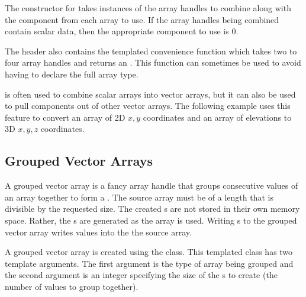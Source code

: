 The constructor for  takes
instances of the array handles to combine along with the component from
each array to use. If the array handles being combined contain scalar data,
then the appropriate component to use is 0.


The  header also
contains the templated convenience function
 which takes two to four array
handles and returns an . This
function can sometimes be used to avoid having to declare the full array
type.


 is often used to combine scalar
arrays into vector arrays, but it can also be used to pull components out
of other vector arrays. The following example uses this feature to convert
an array of 2D $x,y$ coordinates and an array of elevations to 3D $x,y,z$
coordinates.



\subsection{Grouped Vector Arrays}
\label{sec:GroupedVectorArrays}


A grouped vector array is a fancy array handle that groups consecutive
values of an array together to form a . The source array must be
of a length that is divisible by the requested  size.
The created s are not stored in their own memory space. Rather,
the s are generated as the array is used. Writing
s to the grouped vector array writes values into the
the source array.

A grouped vector array is created using the 
class. This templated class has two template arguments. The first argument
is the type of array being grouped and the second argument is an integer
specifying the size of the s to create (the number of
values to group together).

